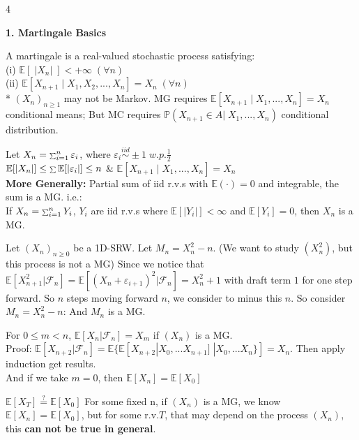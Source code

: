 \documentclass[a4paper, landscape]{article}
\newcommand{\topic}[1]{\par\medskip\textbf{#1}\par}
\newcommand{\subtopic}[1]{\par\textbf{#1}}
\newcommand{\smallsum}{\mathop{\scalebox{0.65}{$\sum$}}\nolimits}
\renewcommand{\topic}[1]{\par\medskip\noindent\colorbox{highlightcolor}{\parbox{\dimexpr\columnwidth-2\fboxsep\relax}{\textbf{#1}}}\par}
\renewcommand{\subtopic}[1]{\par\textbf{\color{blue}{#1}}} %
\begin{document}
\pagestyle{empty}

\fontsize{6}{6}\selectfont

\begin{multicols}{4}


\topic{1. Martingale Basics}
\subtopic{Definition:} A martingale is a real-valued stochastic process satisfying: \\
(i) $\mathbb E[\;|X_n|\;]<+\infty\;(\forall n)$\\
(ii) $\mathbb E[X_{n+1}\;|\;X_1,X_2,...,X_n]=X_n\;(\forall n)$\\
* $(X_n)_{n\geq1}$ may not be Markov. MG requires
$\mathbb E[X_{n+1}\;|\;X_1,...,X_n]=X_n$ conditional means; But MC requires $\mathbb P (X_{n+1}\in A|\;X_1,...,X_n)$ conditional distribution.

\subtopic{Example:SRW} Let $X_n=\smallsum_{i=1}^{n} \varepsilon_i$, where $\varepsilon_i\overset{iid}{\sim}\pm 1\;w.p.\frac12$\\
$\mathbb E[|X_n|]\leq \smallsum \mathbb E[|\varepsilon_i|]\leq n$ \& $\mathbb E[X_{n+1}\;|\;X_1,...,X_n]=X_n$\\
\textbf{More Generally:} Partial sum of iid r.v.s with $\mathbb E(\cdot)=0$ and integrable, the sum is a MG. i.e.:\\
If $X_n=\smallsum_{i=1}^{n}Y_i$, $Y_i$ are iid r.v.s where $\mathbb E[|Y_i|]<\infty$ and $\mathbb E[Y_i]=0$, then $X_n$ is a MG. 

\subtopic{Example: $M_n=X_n^2-n$} Let $(X_n)_{n\ge0}$ be a 1D-SRW. Let $M_n=X_n^2-n$. (We want to study $(X_n^2)$, but this process is not a MG) Since we notice that $\mathbb E[X_{n+1}^2|\mathcal{F}_n]=\mathbb E[(X_n+\varepsilon_{i+1})^2|\mathcal{F}_n]=X_n^2+1$ with draft term $1$ for one step forward. So $n$ steps moving forward $n$, we consider to minus this $n$. So consider $M_n=X_n^2-n$: And $M_n$ is a MG.

\subtopic{Fact:} For $0\leq m< n$, $\mathbb E[X_n | \mathcal F_n]=X_m$ if $(X_n)$ is a MG.\\
Proof:  $\mathbb E[X_{n+2} | \mathcal F_n]=\mathbb E\{\mathbb E[X_{n+2}|X_0,...X_{n+1}]\;|X_0,...X_n\}]=X_n$. Then apply induction get results. \\
And if we take $m=0$, then $\mathbb E[X_n]=\mathbb E[X_0]$

\subtopic{Key Question in MG:} $\mathbb E[X_T]\overset{?}{=}\mathbb E[X_0]$ For some fixed n, if $(X_n)$ is a MG, we know $\mathbb E[X_n]=\mathbb E[X_0]$, but for some r.v.$T$, that may depend on the process $(X_n)$, this \textbf{can not be true in general}.


\end{multicols}
\end{document}
